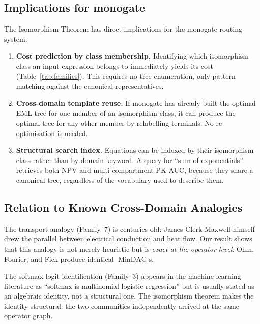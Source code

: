 \documentclass[12pt,a4paper]{article}
\theoremstyle{definition}
\newcommand{\MinDAG}{\operatorname{MinDAG}}
\begin{document}
\subsection{Implications for monogate}

The Isomorphism Theorem has direct implications for the monogate routing system:

\begin{enumerate}
  \item \textbf{Cost prediction by class membership.}
        Identifying which isomorphism class an input expression belongs to
        immediately yields its cost (Table~\ref{tab:families}).  This requires
        no tree enumeration, only pattern matching against the canonical
        representatives.

  \item \textbf{Cross-domain template reuse.}
        If monogate has already built the optimal EML tree for one member of
        an isomorphism class, it can produce the optimal tree for any other
        member by relabelling terminals.  No re-optimisation is needed.

  \item \textbf{Structural search index.}
        Equations can be indexed by their isomorphism class rather than by
        domain keyword.  A query for ``sum of exponentials'' retrieves both
        NPV and multi-compartment PK AUC, because they share a canonical tree,
        regardless of the vocabulary used to describe them.
\end{enumerate}

\subsection{Relation to Known Cross-Domain Analogies}

The transport analogy (Family~7) is centuries old: James Clerk Maxwell himself
drew the parallel between electrical conduction and heat flow.  Our result shows
that this analogy is not merely heuristic but is \emph{exact at the operator
level}: Ohm, Fourier, and Fick produce identical $\MinDAG$s.

The softmax-logit identification (Family~3) appears in the machine learning
literature as ``softmax is multinomial logistic regression'' but is usually
stated as an algebraic identity, not a structural one.  The isomorphism
theorem makes the identity structural: the two communities independently
arrived at the same operator graph.
\end{document}
